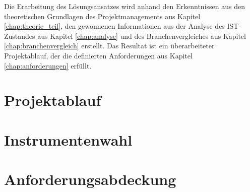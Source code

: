 Die Erarbeitung des Lösungsansatzes wird anhand den Erkenntnissen
aus den theoretischen Grundlagen des Projektmanagements aus Kapitel \ref{chap:theorie_teil},
den gewonnenen Informationen aus der Analyse des IST-Zustandes aus Kapitel \ref{chap:analyse} 
und des Branchenvergleiches aus Kapitel \ref{chap:branchenvergleich} erstellt.
Das Resultat ist ein überarbeiteter Projektablauf, der die definierten Anforderungen 
aus Kapitel \ref{chap:anforderungen} erfüllt.

\section{Projektablauf}


\section{Instrumentenwahl}\label{chap:instrumentenwahl}


\section{Anforderungsabdeckung}

